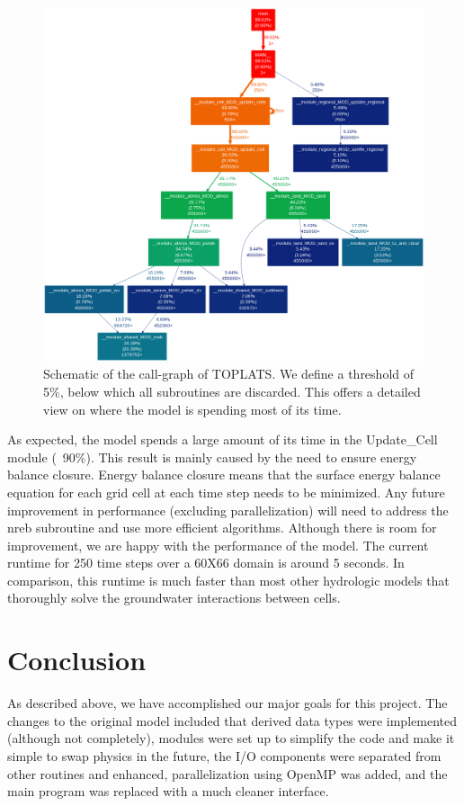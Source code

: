 \documentclass[pdftex,12pt,a4paper]{article}
\begin{document}
\begin{figure}[h]
	\includegraphics[width=5.0in]{Figures/CallGraph.png}

	\caption{Schematic of the call-graph of TOPLATS. We define a threshold of 5\%, below which all subroutines are discarded. This offers a detailed view on where the model is spending most of its time.}
	\label{Profiling1}
\end{figure}

As expected, the model spends a large amount of its time in the Update\_Cell module (~90\%). This result is mainly caused by the need to ensure energy balance closure. Energy balance closure means that the surface energy balance equation for each grid cell at each time step needs to be minimized. Any future improvement in performance (excluding parallelization) will need to address the nreb subroutine and use more efficient algorithms. Although there is room for improvement, we are happy with the performance of the model. The current runtime for 250 time steps over a 60X66 domain is around 5 seconds. In comparison, this runtime is much faster than most other hydrologic models that thoroughly solve the groundwater interactions between cells.

\section{Conclusion}

As described above, we have accomplished our major goals for this project. The changes to the original model included that derived data types were implemented (although not completely), modules were set up to simplify the code and make it simple to swap physics in the future, the I/O components were separated from other routines and enhanced, parallelization using OpenMP was added, and the main program was replaced with a much cleaner interface. 
\end{document}
